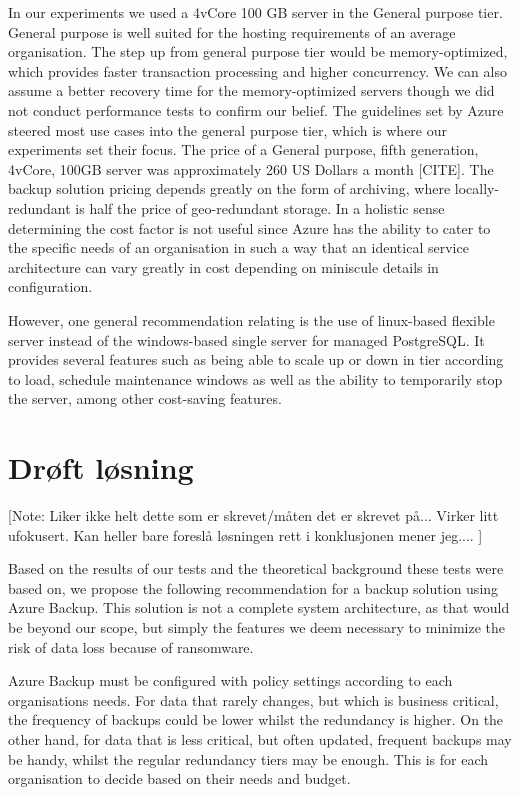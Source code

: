 In our experiments we used a 4vCore 100 GB server in the General purpose tier. General purpose is well suited for the hosting requirements of an average organisation. The step up from general purpose tier would be memory-optimized, which provides faster transaction processing and higher concurrency. We can also assume a better recovery time for the memory-optimized servers though we did not conduct performance tests to confirm our belief. The guidelines set by Azure steered most use cases into the general purpose tier, which is where our experiments set their focus. The price of a General purpose, fifth generation, 4vCore, 100GB server was approximately 260 US Dollars a month [CITE]. %
The backup solution pricing depends greatly on the form of archiving, where locally-redundant is half the price of geo-redundant storage. In a holistic sense determining the cost factor is not useful since Azure has the ability to cater to the specific needs of an organisation in such a way that an identical service architecture can vary greatly in cost depending on miniscule details in configuration.

However, one general recommendation relating is the use of linux-based flexible server instead of the windows-based single server for managed PostgreSQL. It provides several features such as being able to scale up or down in tier according to load, schedule maintenance windows as well as the ability to temporarily stop the server, among other cost-saving features.


\section{Drøft løsning}

[Note: Liker ikke helt dette som er skrevet/måten det er skrevet på... Virker litt ufokusert. Kan heller bare foreslå løsningen rett i konklusjonen mener jeg.... ]

Based on the results of our tests and the theoretical background these tests were based on, we propose the following recommendation for a backup solution using Azure Backup. This solution is not a complete system architecture, as that would be beyond our scope, but simply the features we deem necessary to minimize the risk of data loss because of ransomware. 

Azure Backup must be configured with policy settings according to each organisations needs. For data that rarely changes, but which is business critical, the frequency of backups could be lower whilst the redundancy is higher. On the other hand, for data that is less critical, but often updated, frequent backups may be handy, whilst the regular redundancy tiers may be enough. This is for each organisation to decide based on their needs and budget. 

